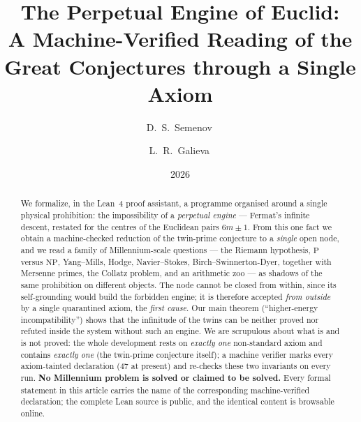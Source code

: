 \documentclass[11pt,a4paper]{amsart}
\title[The Perpetual Engine of Euclid]{The Perpetual Engine of Euclid:\\
  A Machine-Verified Reading of the Great Conjectures through a Single Axiom}
\author[D.~S.~Semenov]{D.~S.~Semenov\,\orcidlink{0009-0006-6213-0638}}
\author[L.~R.~Galieva]{L.~R.~Galieva\,\orcidlink{0009-0009-8656-6040}}
\date{2026}
\begin{document}
\begin{abstract}
We formalize, in the Lean~4 proof assistant, a programme organised around a single
physical prohibition: the impossibility of a \emph{perpetual engine} --- Fermat's infinite
descent, restated for the centres of the Euclidean pairs $6m\pm1$. From this one fact we
obtain a machine-checked reduction of the twin-prime conjecture to a \emph{single} open node,
and we read a family of Millennium-scale questions --- the Riemann hypothesis, $\mathrm{P}$
versus $\mathrm{NP}$, Yang--Mills, Hodge, Navier--Stokes, Birch--Swinnerton-Dyer, together
with Mersenne primes, the Collatz problem, and an arithmetic zoo --- as shadows of the same
prohibition on different objects. The node cannot be closed from within, since its
self-grounding would build the forbidden engine; it is therefore accepted \emph{from outside}
by a single quarantined axiom, the \emph{first cause}. Our main theorem
(``higher-energy incompatibility'') shows that the infinitude of the twins can be neither
proved nor refuted inside the system without such an engine. We are scrupulous about what is
and is not proved: the whole development rests on \emph{exactly one} non-standard axiom and
contains \emph{exactly one}  (the twin-prime conjecture itself); a machine verifier
marks every axiom-tainted declaration ($47$ at present) and re-checks these two invariants on
every run. \textbf{No Millennium problem is solved or claimed to be solved.} Every formal
statement in this article carries the name of the corresponding machine-verified declaration;
the complete Lean source is public, and the identical content is browsable online.
\end{abstract}

\maketitle

\begin{center}\small
{}
\end{center}
\end{document}
